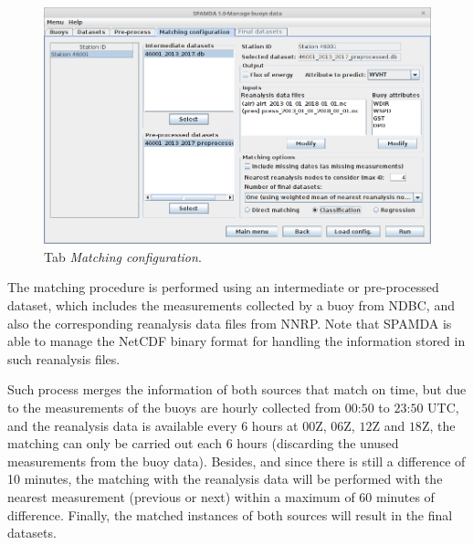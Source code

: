 \begin{onehalfspace}
				\begin{figure}[ht!]
					\centering
					\includegraphics[scale=0.40]{figures/tabMatchingConfiguration.png}
					\caption{Tab \textit{Matching configuration}.}
					\label{fig:tabMatchingConfiguration}
				\end{figure}
			
				The matching procedure is performed using an intermediate or pre-processed dataset, which includes the measurements collected by a buoy from NDBC, and also the corresponding reanalysis data files from NNRP. Note that SPAMDA is able to manage the NetCDF binary format for handling the information stored in such reanalysis files.
				
				
				Such process merges the information of both sources that match on time, but due to the measurements of the buoys are hourly collected from $00$:$50$ to $23$:$50$ UTC, and the reanalysis data is available every $6$ hours at $00$Z, $06$Z, $12$Z and $18$Z, the matching can only be carried out each $6$ hours (discarding the unused measurements from the buoy data). Besides, and since there is still a difference of 10 minutes, the matching with the reanalysis data will be performed with the nearest measurement (previous or next) within a maximum of 60 minutes of difference. Finally, the matched instances of both sources will result in the final datasets.
				

\end{onehalfspace}
